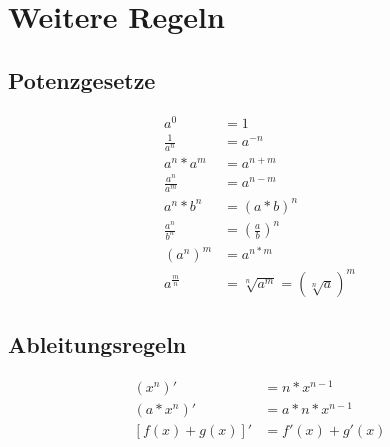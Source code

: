 \chapter{Weitere Regeln}

\section{Potenzgesetze}

\begin{align}
    a^0 &= 1 \\
    \frac{1}{a^n} &= a^{-n} \\
    a^n*a^m &= a^{n+m} \\
    \frac{a^n}{a^m} &= a^{n-m} \\
    a^n*b^n &= (a*b)^n \\
    \frac{a^n}{b^n} &= \left(\frac{a}{b}\right)^n \\
    \left(a^n\right)^m &= a^{n*m} \\
    a^{\frac{m}{n}} &= \sqrt[n]{a^m}=\left(\sqrt[n]{a}\right)^m
\end{align}

\section{Ableitungsregeln}

\begin{align}
    \left(x^n\right)' &=n*x^{n-1} \\
    \left(a*x^n\right)' &=a*n*x^{n-1} \\
    \left[f(x)+g(x)\right]' &=f'(x)+g'(x) \\
\end{align}
